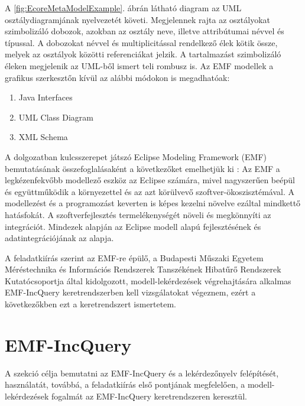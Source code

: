 A \ref{fig:EcoreMetaModelExample}. ábrán látható diagram az \gls{UML} osztálydiagramjának nyelvezetét követi.
Megjelennek rajta az osztályokat szimbolizáló dobozok, azokban az osztály neve, illetve attribútumai névvel és típussal.
A dobozokat névvel és multiplicitással rendelkező élek kötik össze, melyek az osztályok közötti referenciákat jelzik.
A tartalmazást szimbolizáló éleken megjelenik az UML-ből ismert teli rombusz is.
Az \gls{EMF} modellek a grafikus szerkesztőn kívül az alábbi módokon is megadhatóak:
\begin{enumerate}
	\item Java Interfaces
	\item UML Class Diagram
	\item XML Schema
\end{enumerate}

A dolgozatban kulcsszerepet játszó Eclipse Modeling Framework (\gls{EMF}) bemutatásának összefoglalásaként a következőket emelhetjük ki \cite{EMFFundamentals}:
Az \gls{EMF} a legkézenfekvőbb modellező eszköz az Eclipse számára, mivel nagyszerűen beépül és együttműködik a környezettel és az azt körülvevő szoftver-ökoszisztémával.
A modellezést és a programozást keverten is képes kezelni növelve ezáltal mindkettő hatásfokát.
A szoftverfejlesztés termelékenységét növeli és megkönnyíti az integrációt.
Mindezek alapján az Eclipse modell alapú fejlesztésének és adatintegrációjának az alapja. 

A feladatkiírás szerint az \gls{EMF}-re épülő, a Budapesti Műszaki Egyetem Méréstechnika és Információs Rendszerek Tanszékének Hibatűrő Rendszerek Kutatócsoportja által kidolgozott, modell-lekérdezések végrehajtására alkalmas EMF-IncQuery keretrendszerben kell vizsgálatokat végeznem, ezért a következőkben ezt a keretrendszert ismertetem.


\section{EMF-IncQuery}\label{sect:IncQuery}

A szekció célja bemutatni az EMF-IncQuery és a lekérdezőnyelv felépítését, használatát, továbbá, a feladatkiírás első pontjának megfelelően, a modell-lekérdezések fogalmát az EMF-IncQuery keretrendszeren keresztül.

